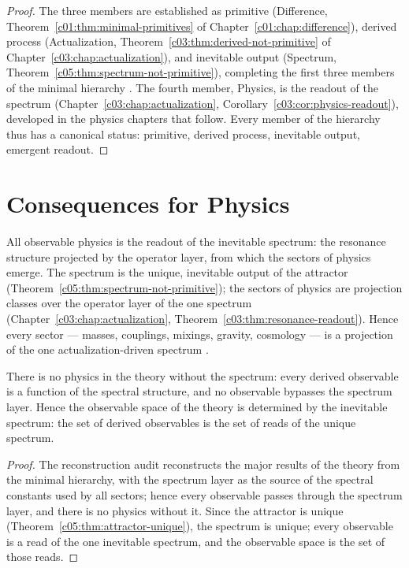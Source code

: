 \begin{proof}
The three members are established as primitive (Difference,
Theorem~\ref{c01:thm:minimal-primitives} of Chapter~\ref{c01:chap:difference}), derived process
(Actualization, Theorem~\ref{c03:thm:derived-not-primitive} of
Chapter~\ref{c03:chap:actualization}), and inevitable output (Spectrum,
Theorem~\ref{c05:thm:spectrum-not-primitive}), completing the first three members of the
minimal hierarchy \cite{c05:QG293,c05:QG294}. The fourth member, Physics, is the readout of the
spectrum (Chapter~\ref{c03:chap:actualization}, Corollary~\ref{c03:cor:physics-readout}),
developed in the physics chapters that follow. Every member of the hierarchy thus has a
canonical status: primitive, derived process, inevitable output, emergent readout.
\end{proof}

\section{Consequences for Physics}
\label{c05:sec:physics-consequences}

All observable physics is the readout of the inevitable spectrum: the resonance structure
projected by the operator layer, from which the sectors of physics emerge. The spectrum is
the unique, inevitable output of the attractor (Theorem~\ref{c05:thm:spectrum-not-primitive});
the sectors of physics are projection classes over the operator layer of the one spectrum
(Chapter~\ref{c03:chap:actualization}, Theorem~\ref{c03:thm:resonance-readout}). Hence every
sector --- masses, couplings, mixings, gravity, cosmology --- is a projection of the one
actualization-driven spectrum \cite{c05:QG272}.

\begin{theorem}
\label{c05:thm:no-physics-without-spectrum}
There is no physics in the theory without the spectrum: every derived observable is a
function of the spectral structure, and no observable bypasses the spectrum layer. Hence the
observable space of the theory is determined by the inevitable spectrum: the set of derived
observables is the set of reads of the unique spectrum.
\end{theorem}

\begin{proof}
The reconstruction audit \cite{c05:QG296} reconstructs the major results of the theory from the
minimal hierarchy, with the spectrum layer as the source of the spectral constants used by
all sectors; hence every observable passes through the spectrum layer, and there is no
physics without it. Since the attractor is unique (Theorem~\ref{c05:thm:attractor-unique}),
the spectrum is unique; every observable is a read of the one inevitable spectrum, and the
observable space is the set of those reads.
\end{proof}

